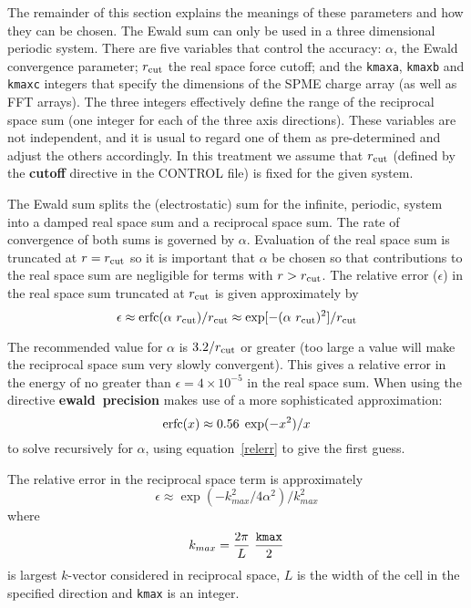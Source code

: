 The remainder of this section explains the meanings of these
parameters and how they can be chosen.  The Ewald
sum can only be used in a three dimensional
periodic system.  There are five variables that control the
accuracy: $\alpha$, the Ewald convergence parameter; $r_{\rm cut}$
the real space force cutoff; and the {\tt kmaxa}, {\tt kmaxb} and
{\tt kmaxc} integers that specify the dimensions of the SPME
charge array (as well as FFT arrays).  The three integers
effectively define the range of the reciprocal space sum
(one integer for each of the three axis directions).  These
variables are not independent, and it is usual to regard one of
them as pre-determined and adjust the others accordingly.  In this
treatment we assume that $r_{\rm cut}$ (defined by the {\bf cutoff}
directive in the CONTROL file) is fixed for the given system.

The Ewald sum splits the (electrostatic) sum for the infinite,
periodic, system into a damped real space sum and a reciprocal
space sum.  The rate of convergence of both sums is governed by
$\alpha$.  Evaluation of the real space sum is truncated at
$r=r_{\rm cut}$ so it is important that $\alpha$ be chosen so that
contributions to the real space sum are negligible for terms with
$r>r_{\rm cut}$.  The relative error ($\epsilon$) in the real
space sum truncated at $r_{\rm cut}$ is given approximately
by
\begin{equation}
\epsilon \approx {\rm erfc}(\alpha~r_{\rm cut})/r_{\rm cut}
\approx \exp[-(\alpha~r_{\rm cut})^{2}]/r_{\rm cut} \label{relerr}
\end{equation}

The recommended value for $\alpha$ is $3.2/r_{\rm cut}$ or greater
(too large a value will make the reciprocal space sum very slowly
convergent).  This gives a relative error in the energy of no
greater than $\epsilon = 4 \times 10^{-5}$ in the real space sum.
When using the directive {\bf ewald~precision} \D makes use of a
more sophisticated approximation:
\begin{equation}
{\rm erfc}(x) \approx 0.56 \; \exp(-x^{2})/x
\end{equation}
to solve recursively for $\alpha$, using equation~\ref{relerr} to give
the first guess.

The relative error in the reciprocal space term is approximately
\begin{equation}
\epsilon \approx \exp(- k_{max}^{2}/4\alpha^{2})/k_{max}^{2}
\end{equation}
where
\begin{equation}
k_{max} = \frac{2\pi}{L}~\frac{\tt kmax}{2}
\end{equation}
is largest $k$-vector considered in reciprocal space, $L$ is the
width of the cell in the specified direction and {\tt kmax} is an integer.

